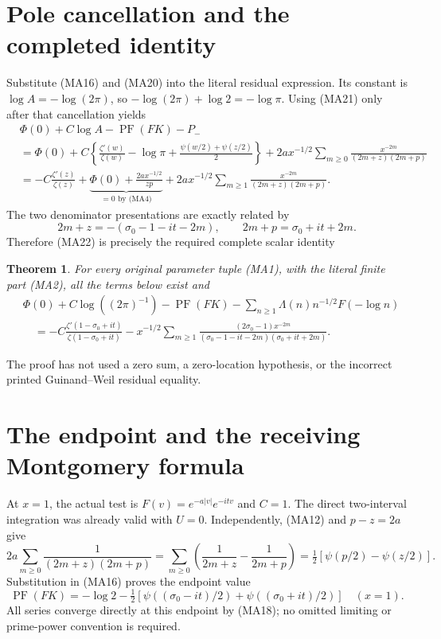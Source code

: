 \documentclass[11pt]{article}
\newtheorem{theorem}{Theorem}\newtheorem{lemma}{Lemma}
\newcommand{\PF}{\operatorname{PF}}\newcommand{\dd}{\,d}
\begin{document}
\section{Pole cancellation and the completed identity}
Substitute (MA16) and (MA20) into the literal residual expression. Its
constant is $\log A=-\log(2\pi)$, so $-\log(2\pi)+\log2=-\log\pi$.
Using (MA21) only after that cancellation yields
\begin{equation}\tag{MA22}\begin{aligned}
 &\Phi(0)+C\log A-\PF(FK)-P_-\\
 &=\Phi(0)+C\left\{\frac{\zeta'(w)}{\zeta(w)}-\log\pi
              +\frac{\psi(w/2)+\psi(z/2)}2\right\}
       +2a x^{-1/2}\sum_{m\ge0}\frac{x^{-2m}}{(2m+z)(2m+p)}\\
 &=-C\frac{\zeta'(z)}{\zeta(z)}
   +\underbrace{\Phi(0)+\frac{2a x^{-1/2}}{zp}}_{=0\text{ by (MA4)}}
   +2a x^{-1/2}\sum_{m\ge1}\frac{x^{-2m}}{(2m+z)(2m+p)}.
\end{aligned}\end{equation}
The two denominator presentations are exactly related by
\[
 2m+z=-(\sigma_0-1-it-2m),\qquad 2m+p=\sigma_0+it+2m.
\]
Therefore (MA22) is precisely the required complete scalar identity
\begin{theorem}
For every original parameter tuple (MA1), with the literal finite part
(MA2), all the terms below exist and
\begin{equation}\tag{MA23}\begin{aligned}
 &\Phi(0)+C\log((2\pi)^{-1})-\PF(FK)
   -\sum_{n\ge1}\Lambda(n)n^{-1/2}F(-\log n)\\
 &\quad=-C\frac{\zeta'(1-\sigma_0+it)}{\zeta(1-\sigma_0+it)}
 -x^{-1/2}\sum_{m\ge1}
 \frac{(2\sigma_0-1)x^{-2m}}
      {(\sigma_0-1-it-2m)(\sigma_0+it+2m)}.
\end{aligned}\end{equation}
\end{theorem}
The proof has not used a zero sum, a zero-location hypothesis, or the
incorrect printed Guinand--Weil residual equality.

\section{The endpoint and the receiving Montgomery formula}
At $x=1$, the actual test is $F(v)=e^{-a|v|}e^{-itv}$ and $C=1$.
The direct two-interval integration was already valid with $U=0$.
Independently, (MA12) and $p-z=2a$ give
\[
 2a\sum_{m\ge0}\frac1{(2m+z)(2m+p)}
 =\sum_{m\ge0}\left(\frac1{2m+z}-\frac1{2m+p}\right)
 =\tfrac12[\psi(p/2)-\psi(z/2)].
\]
Substitution in (MA16) proves the endpoint value
\begin{equation}\tag{MA24}
 \boxed{\PF(FK)=-\log2-\tfrac12
 [\psi((\sigma_0-it)/2)+\psi((\sigma_0+it)/2)]\quad(x=1).}
\end{equation}
All series converge directly at this endpoint by (MA18); no omitted
limiting or prime-power convention is required.
\end{document}
